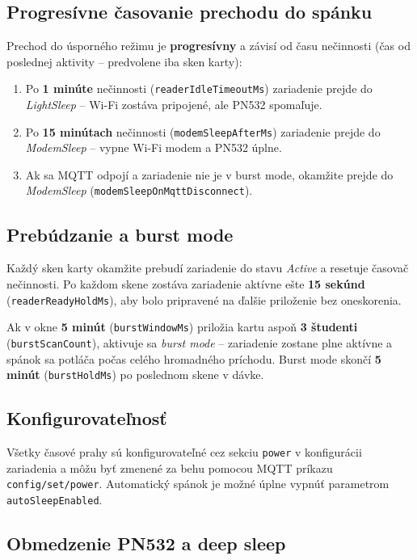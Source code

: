 \subsection*{Progresívne časovanie prechodu do spánku}

Prechod do úsporného režimu je \textbf{progresívny} a závisí od času nečinnosti (čas od poslednej aktivity -- predvolene iba sken karty):

\begin{enumerate}
    \item Po \textbf{1 minúte} nečinnosti (\texttt{readerIdleTimeoutMs}) zariadenie prejde do \textit{LightSleep} -- Wi-Fi zostáva pripojené, ale PN532 spomaľuje.
    \item Po \textbf{15 minútach} nečinnosti (\texttt{modemSleepAfterMs}) zariadenie prejde do \textit{ModemSleep} -- vypne Wi-Fi modem a PN532 úplne.
    \item Ak sa MQTT odpojí a zariadenie nie je v burst mode, okamžite prejde do \textit{ModemSleep} (\texttt{modemSleepOnMqttDisconnect}).
\end{enumerate}

\subsection*{Prebúdzanie a burst mode}

Každý sken karty okamžite prebudí zariadenie do stavu \textit{Active} a resetuje časovač nečinnosti. Po každom skene zostáva zariadenie aktívne ešte \textbf{15 sekúnd} (\texttt{readerReadyHoldMs}), aby bolo pripravené na ďalšie priloženie bez oneskorenia.

Ak v okne \textbf{5 minút} (\texttt{burstWindowMs}) priložia kartu aspoň \textbf{3 študenti} (\texttt{burstScanCount}), aktivuje sa \textit{burst mode} -- zariadenie zostane plne aktívne a spánok sa potláča počas celého hromadného príchodu. Burst mode skončí \textbf{5 minút} (\texttt{burstHoldMs}) po poslednom skene v dávke.

\subsection*{Konfigurovateľnosť}

Všetky časové prahy sú konfigurovateľné cez sekciu \texttt{power} v konfigurácii zariadenia a môžu byť zmenené za behu pomocou MQTT príkazu \texttt{config/set/power}. Automatický spánok je možné úplne vypnúť parametrom \texttt{autoSleepEnabled}.

\subsection*{Obmedzenie PN532 a deep sleep}

